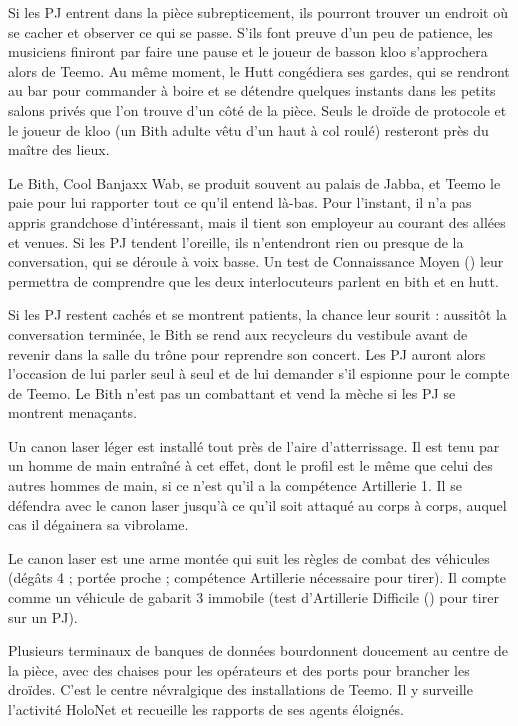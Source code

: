 \documentclass[a4paper,10pt,twoside,twocolumn,openany]{book}
\begin{document}
Si les PJ entrent dans la pièce subrepticement, ils
pourront trouver un endroit où se cacher et observer
ce qui se passe. S’ils font preuve d’un peu de patience,
les musiciens finiront par faire une pause et le joueur de
basson kloo s’approchera alors de Teemo. Au même moment, le Hutt congédiera ses gardes, qui se rendront au
bar pour commander à boire et se détendre quelques
instants dans les petits salons privés que l’on trouve d’un
côté de la pièce. Seuls le droïde de protocole et le joueur
de kloo (un Bith adulte vêtu d’un haut à col roulé) resteront près du maître des lieux.

Le Bith, Cool Banjaxx Wab, se produit souvent au palais de Jabba, et Teemo le paie pour lui rapporter tout ce
qu’il entend là-bas. Pour l’instant, il n’a pas appris grandchose d’intéressant, mais il tient son employeur au courant des allées et venues. Si les PJ tendent l’oreille, ils
n’entendront rien ou presque de la conversation, qui se
déroule à voix basse. Un test de Connaissance Moyen
(\difficulty \difficulty) leur permettra de comprendre que les deux interlocuteurs parlent en bith et en hutt.

Si les PJ restent cachés et se montrent patients, la
chance leur sourit : aussitôt la conversation terminée, le
Bith se rend aux recycleurs du vestibule avant de revenir
dans la salle du trône pour reprendre son concert. Les
PJ auront alors l’occasion de lui parler seul à seul et de
lui demander s’il espionne pour le compte de Teemo. Le
Bith n’est pas un combattant et vend la mèche si les PJ
se montrent menaçants.

\subtitle{AIRE D’ATTERRISSAGE}

Un canon laser léger est installé tout près de l’aire d’atterrissage. Il est tenu par un homme de main entraîné à
cet effet, dont le profil est le même que celui des autres
hommes de main, si ce n’est qu’il a la compétence Artillerie 1. Il se défendra avec le canon laser jusqu’à ce qu’il
soit attaqué au corps à corps, auquel cas il dégainera
sa vibrolame.

Le canon laser est une arme montée qui suit les règles
de combat des véhicules (dégâts 4 ; portée proche ;
compétence Artillerie nécessaire pour tirer). Il compte
comme un véhicule de gabarit 3 immobile (test d’Artillerie Difficile (\difficulty \difficulty \difficulty) pour tirer sur un PJ).

\subtitle{CENTRE DES COMMUNICATIONS}

Plusieurs terminaux de banques de données bourdonnent doucement au centre de la pièce, avec des
chaises pour les opérateurs et des ports pour brancher
les droïdes. C’est le centre névralgique des installations
de Teemo. Il y surveille l’activité HoloNet et recueille les
rapports de ses agents éloignés.
\end{document}
